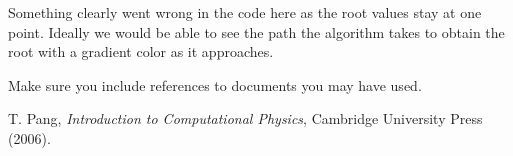 \documentclass[prb,twocolumn]{revtex4-2}
\begin{document}
Something clearly went wrong in the code here as the root values stay at one point. Ideally we would be able to see the path the algorithm takes to obtain the root with a gradient color as it approaches.

Make sure you include references to documents \cite{thecoursetext} you may have used.

\begin{thebibliography}{99}

 T. Pang, \emph{Introduction to Computational Physics}, Cambridge University Press (2006).

\end{thebibliography}
\end{document}
